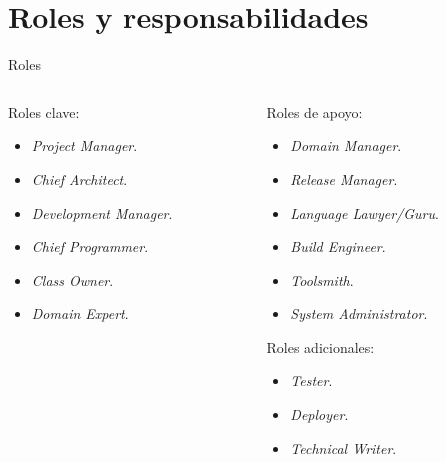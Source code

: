 \documentclass[12pt]{beamer}
\begin{document}
\section{Roles y responsabilidades}\label{rol}
\begin{frame}[fragile]{Roles}
  \begin{columns}
    \begin{column}{0.6\textwidth}
Roles clave:
\begin{itemize}
\item \textit{Project Manager}.
\item \textit{Chief Architect}.
\item \textit{Development Manager}.
\item \textit{Chief Programmer}. 
\item \textit{Class Owner}. 
\item \textit{Domain Expert}.
\end{itemize}
\end{column}

\begin{column}{0.4\textwidth}
  
  \footnotesize
  \vspace{0.5cm}
Roles de apoyo:
\begin{itemize}\footnotesize
\item \textit{Domain Manager}.
\item \textit{Release Manager}.
\item \textit{Language Lawyer/Guru}.
\item \textit{Build Engineer}. 
\item \textit{Toolsmith}. 
\item \textit{System Administrator}.
\end{itemize}

Roles adicionales:

\begin{itemize}\footnotesize
\item \textit{Tester}.
\item \textit{Deployer}. 
\item \textit{Technical Writer}.
\end{itemize}
\end{column}
\end{columns}
\end{frame}
\end{document}
